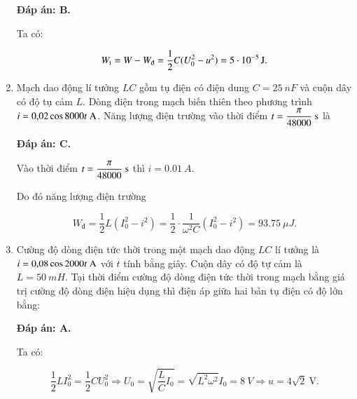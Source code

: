 \begin{enumerate}[label=\bfseries Câu \arabic*:]
	\hideall
	{		\textbf{Đáp án: B.}
		
		Ta có:
		
		$$W_\text t = W - W_\text{đ} = \dfrac{1}{2}C(U_0^2 - u^2) = \xsi{5\cdot 10^{-5}}{J}.$$
		
	}
		\item {}
	
	{Mạch dao động lí tưởng $LC$ gồm tụ điện có điện dung $C = \SI{25}{nF}$ và cuộn dây có độ tụ cảm $L$. Dòng điện trong mạch biến thiên theo phương trình $i = \text{0,02} \cos 8000 t\ \text A$. Năng lượng điện trường vào thời điểm $t = \dfrac{\pi}{48000}\ \text s$ là
		
	}
	
	\hideall
	{		\textbf{Đáp án: C.}
		
		Vào thời điểm $t = \dfrac{\pi}{48000}\ \text s$ thì $i = \SI{0,01}{A}.$
		
		Do đó năng lượng điện trường
		
		$$W_\text{đ} = \dfrac{1}{2} L(I_0^2 -i^2) = \dfrac{1}{2} \cdot \dfrac{1}{\omega^2 C} (I_0^2 - i^2) = \SI{93,75}{\mu J}.$$
		
		
	}
		\item {}
	
	{
		Cường độ dòng điện tức thời trong một mạch dao động $LC$ lí tưởng là $i =\text{0,08} \cos 2000 t\ \text A$ với $t$ tính bằng giây. Cuộn dây có độ tự cảm là $L = \SI{50}{mH}$. Tại thời điểm cường độ dòng điện tức thời trong mạch bằng giá trị cường độ dòng điện hiệu dụng thì điện áp giữa hai bản tụ điện có độ lớn bằng:
		
	}
	
	\hideall
	{		\textbf{Đáp án: A.}
		
		Ta có: 
		
		$$\dfrac{1}{2}LI^2_0 = \dfrac{1}{2} CU^2_0 \Rightarrow U_0 = \sqrt{\dfrac{L}{C}I_0} = \sqrt{L^2\omega^2}I_0 = \SI{8}{V}  \Rightarrow u = 4\sqrt 2\ \text{V}.$$
		
}
\end{enumerate}

